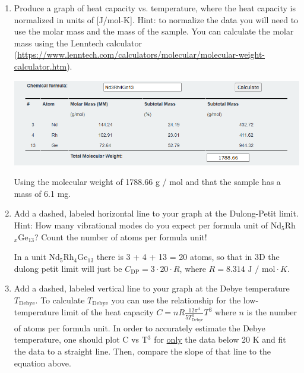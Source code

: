 \begin{enumerate}
    \item Produce a graph of heat capacity vs. temperature, where the heat capacity is normalized in units of [J/mol-K]. Hint: to normalize the data you will need to use the molar mass and the mass of the sample. You can calculate the molar mass using the Lenntech calculator (\url{https://www.lenntech.com/calculators/molecular/molecular-weight-calculator.htm}).

    \divider
    
    \begin{center}
        \includegraphics[width = 0.8\linewidth]{Images/molar-mass-hw1.png}
    \end{center}

    Using the molecular weight of 1788.66 g / mol and that the sample has a mass of 6.1 mg.

    \item Add a dashed, labeled horizontal line to your graph at the Dulong-Petit limit. Hint: How many vibrational modes do you expect per formula unit of Nd$_5$Rh$_x$Ge$_{13}$? Count the number of atoms per formula unit!

    \divider 

    In a unit Nd$_5$Rh$_4$Ge$_{13}$ there is 3 + 4 + 13 = 20 atoms, so that in 3D the dulong petit limit will just be $C_{\text{DP}} = 3 \cdot 20 \cdot R$, where $R = 8.314  \text{ J / mol}\cdot K $.

    \item Add a dashed, labeled vertical line to your graph at the Debye temperature $T_{\text{Debye}}$. To calculate $T_{\text{Debye}}$ you can use the relationship for the low-temperature limit of the heat capacity $C = nR \frac{12\pi^4}{5 T_{\text{Debye}}^3} T^3$ where $n$ is the number of atoms per formula unit. In order to accurately estimate the Debye temperature, one should plot C vs T$^3$ for \underline{only} the data below 20 K and fit the data to a straight line. Then, compare the slope of that line to the equation above.
    
    \divider


\end{enumerate}
